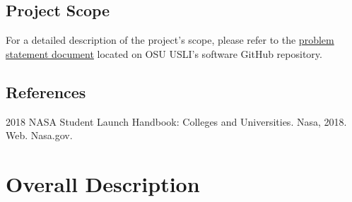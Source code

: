 \documentclass[onecolumn, draftclsnofoot, 10pt, compsoc]{IEEEtran}
\begin{document}
\subsection{Project Scope}
For a detailed description of the project's scope, please refer to the \href{https://github.com/OSU-USLI-18/Payload-Software/tree/master/capstone-documentation/33_problem_statement}{problem statement document} located on OSU USLI's software GitHub repository.

\subsection{References}
2018 NASA Student Launch Handbook: Colleges and Universities. Nasa, 2018. Web. Nasa.gov.

\section{Overall Description}
\end{document}
